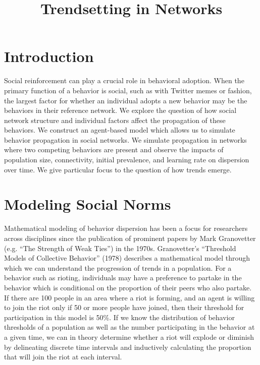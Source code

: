 \documentclass[11pt]{article}
\title{Trendsetting in Networks}
\begin{document}
    
    
    \maketitle
    
    

    
    \hypertarget{introduction}{%
\section{Introduction}\label{introduction}}

Social reinforcement can play a crucial role in behavioral adoption.
When the primary function of a behavior is social, such as with Twitter
memes or fashion, the largest factor for whether an individual adopts a
new behavior may be the behaviors in their reference network. We explore
the question of how social network structure and individual factors
affect the propagation of these behaviors. We construct an agent-based
model which allows us to simulate behavior propagation in social
networks. We simulate propagation in networks where two competing
behaviors are present and observe the impacts of population size,
connectivity, initial prevalence, and learning rate on dispersion over
time. We give particular focus to the question of how trends emerge.

\hypertarget{modeling-social-norms}{%
\section{Modeling Social Norms}\label{modeling-social-norms}}

Mathematical modeling of behavior dispersion has been a focus for
researchers across disciplines since the publication of prominent papers
by Mark Granovetter (e.g. ``The Strength of Weak Ties'') in the 1970s.
Granovetter's ``Threshold Models of Collective Behavior'' (1978)
describes a mathematical model through which we can understand the
progression of trends in a population. For a behavior such as rioting,
individuals may have a preference to partake in the behavior which is
conditional on the proportion of their peers who also partake. If there
are 100 people in an area where a riot is forming, and an agent is
willing to join the riot only if 50 or more people have joined, then
their threshold for participation in this model is 50\%. If we know the
distribution of behavior thresholds of a population as well as the
number participating in the behavior at a given time, we can in theory
determine whether a riot will explode or diminish by delineating
discrete time intervals and inductively calculating the proportion that
will join the riot at each interval.
\end{document}
